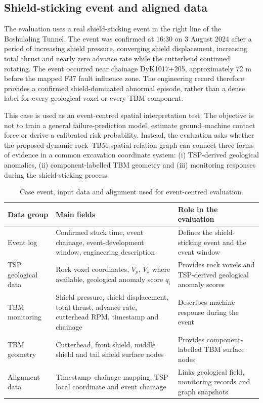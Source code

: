 \subsection{Shield-sticking event and aligned data}
\label{sec:event-data}

The evaluation uses a real shield-sticking event in the right line of the Boshulaling Tunnel. The event was confirmed at 16:30 on 3 August 2024 after a period of increasing shield pressure, converging shield displacement, increasing total thrust and nearly zero advance rate while the cutterhead continued rotating. The event occurred near chainage DyK1017+205, approximately 72 m before the mapped F37 fault influence zone. The engineering record therefore provides a confirmed shield-dominated abnormal episode, rather than a dense label for every geological voxel or every TBM component.

This case is used as an event-centred spatial interpretation test. The objective is not to train a general failure-prediction model, estimate ground--machine contact force or derive a calibrated risk probability. Instead, the evaluation asks whether the proposed dynamic rock--TBM spatial relation graph can connect three forms of evidence in a common excavation coordinate system: (i) TSP-derived geological anomalies, (ii) component-labelled TBM geometry and (iii) monitoring responses during the shield-sticking process.

\begin{table}[!ht]
\centering
\caption{Case event, input data and alignment used for event-centred evaluation.}
\label{tab:case-data-alignment}
\begin{tabular}{p{}p{}p{}}
\toprule
Data group & Main fields & Role in the evaluation \\
\midrule
Event log & Confirmed stuck time, event chainage, event-development window, engineering description & Defines the shield-sticking event and the event window \\
TSP geological data & Rock voxel coordinates, $V_p$, $V_s$ where available, geological anomaly score $q_i$ & Provides rock voxels and TSP-derived geological anomaly scores \\
TBM monitoring & Shield pressure, shield displacement, total thrust, advance rate, cutterhead RPM, timestamp and chainage & Describes machine response during the event \\
TBM geometry & Cutterhead, front shield, middle shield and tail shield surface nodes & Provides component-labelled TBM surface nodes \\
Alignment data & Timestamp--chainage mapping, TSP local coordinate and event chainage & Links geological field, monitoring records and graph snapshots \\
\bottomrule
\end{tabular}
\end{table}

